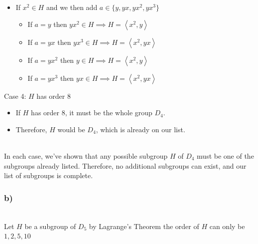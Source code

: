 \documentclass[12pt, letterpaper]{article}
\theoremstyle{definition}
\newcommand{\ang}[1]{\left\langle #1 \right\rangle}
\begin{document}
\begin{itemize}
\begin{itemize}
        \item If $x^2 \in H$ and we then add $a \in \{y,yx,yx^2,yx^3\}$
        \begin{itemize}
            \item If $a=y$ then $yx^2 \in H \implies H=\ang{x^2,y}$
            \item If $a=yx$ then $yx^3 \in H \implies H=\ang{x^2,yx}$
            \item If $a=yx^2$ then $y \in H \implies H=\ang{x^2,y}$
            \item If $a=yx^3$ then $yx \in H \implies H=\ang{x^2,yx}$
        \end{itemize}
    \end{itemize}
\end{itemize}

Case 4: \(H\) has order 8
\begin{itemize}
    \item If \( H \) has order 8, it must be the whole group \( D_4 \).
    \item Therefore, \( H \) would be \( D_4 \), which is already on our list.
\end{itemize}
\phantom{text}\\
In each case, we’ve shown that any possible subgroup \( H \) of \( D_4 \) must be one of the subgroups already listed. Therefore, no additional subgroups can exist, and our list of subgroups is complete.

\newpage
\subsubsection*{b)}
\phantom{text}\\
Let $H$ be a subgroup of $D_5$ by Lagrange's Theorem the order of $H$ can only be $1,2,5,10$
\end{document}
